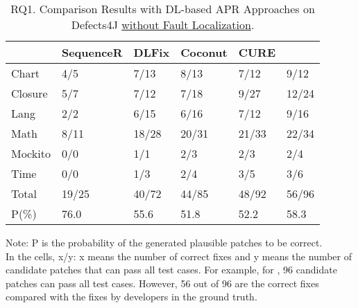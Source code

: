 


\begin{table}[t]
  \caption{RQ1. Comparison Results with DL-based APR Approaches on Defects4J \underline {without Fault Localization}.}
  \vspace{-6pt}
  {\small
			\begin{center}
				\renewcommand{\arraystretch}{1}
				\begin{tabular}{p{0.9cm}<{\centering}|p{1.4cm}<{\centering}|p{1cm}<{\centering}|p{1cm}<{\centering}|p{1cm}<{\centering}|p{1cm}<{\centering}}
					
					\hline
					&\textbf{SequenceR}&\textbf{DLFix}& \textbf{Coconut}&\textbf{CURE}&\textbf{\tool}\\
					\hline
					Chart  & 4/5   & 7/13  & 8/13  & 7/12   & 9/12\\
					Closure& 5/7   & 7/12  & 7/18  & 9/27   & 12/24\\
					Lang   & 2/2   & 6/15  & 6/16  & 7/12   & 9/16\\
					Math    & 8/11  & 18/28 & 20/31 & 21/33  & 22/34\\
					Mockito & 0/0   & 1/1   & 2/3   & 2/3    & 2/4\\
					Time    & 0/0   & 1/3   & 2/4   & 3/5    & 3/6\\
					\hline
					Total   & 19/25 & 40/72 & 44/85 & 48/92  & 56/96\\
					\hline
					P(\%)  & 76.0  & 55.6  & 51.8  & 52.2   & 58.3\\
					\hline
				\end{tabular}
			{\footnotesize{
				Note: P is the probability of the generated plausible patches to be correct.\\
				In the cells, x/y: x means the number of correct fixes and y means the number of candidate patches that can pass all test cases. For example, for \tool, 96 candidate patches can pass all test cases. However, 56 out of 96 are the correct fixes compared with the fixes by developers in the ground truth.}}
				\label{RQ1_defect4j}
			\end{center}
                }
		\end{table}


